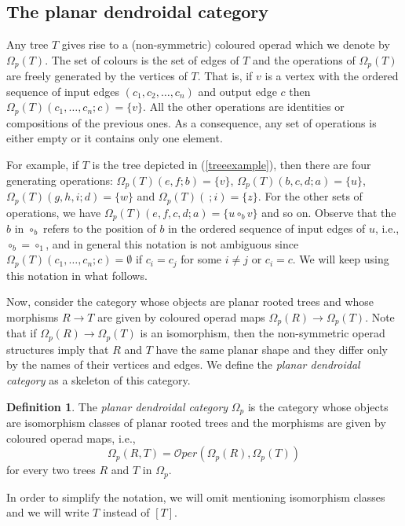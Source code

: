 \documentclass[a4paper]{amsart}
\theoremstyle{plain}
\theoremstyle{definition}
\newtheorem{dfn}[thm]{Definition}
\theoremstyle{remark}
\newcommand{\rpd}{\Omega_p}
\newcommand{\To}{\longrightarrow}
\newcommand{\Oper}{\mathcal{O}per}
\numberwithin{equation}{section}
\numberwithin{figure}{section}
\begin{document}
\subsection{The planar dendroidal category }\label{the basic category}
Any tree $T$ gives rise to a (non-symme\-tric) coloured operad which
we denote by $\Omega_p(T)$. The set of colours is the set of edges of
$T$ and the operations of $\Omega_p(T)$ are freely generated by the
vertices of $T$. That is, if $v$ is a vertex with the ordered
sequence of input edges $(c_1, c_2, \ldots, c_n)$ and output edge
$c$ then $\Omega_p(T)(c_1,\ldots,c_n;c)=\{v\}$. All the other
operations are identities or compositions of the previous ones. As a
consequence, any set of operations is either empty or it contains
only one element.

For example, if $T$ is the tree depicted in (\ref{treeexample}), then there are four generating operations:
$\Omega_p(T)(e,f;b)=\{v\}$, $\Omega_p(T)(b,c,d;a)=\{u\}$, $\Omega_p(T)(g,h,i;d)=\{w\}$ and $\Omega_p(T)(\ ;i)=\{z\}$.
For the other sets of operations, we have $\Omega_p(T)(e,f,c,d;a)=\{u\circ_b v\}$ and so on.
Observe that the $b$ in $\circ_b$ refers to the position of $b$ in the ordered sequence of input edges of $u$, i.e.,
$\circ_b=\circ_1$, and in general this notation is not ambiguous since $\Omega_p(T)(c_1,\ldots, c_n;c)=\emptyset$ if $c_i=c_j$
for some $i\neq j$ or $c_i=c$. We will keep using this notation in what follows.

Now, consider the category whose objects are planar rooted trees and whose morphisms $R\To T$ are given by coloured
operad maps $\Omega_p(R)\To\Omega_p(T)$. Note that if $\Omega_p(R)\longrightarrow \Omega_p(T)$ is an isomorphism, then the
non-symmetric operad structures imply that $R$ and $T$ have the same planar shape and they differ only by the names of
their vertices and edges. We define the \textit{planar dendroidal category} as a skeleton of this category.

\begin{dfn}
    The \emph{planar dendroidal category} $\rpd$ is the category whose objects are isomorphism classes of
    planar rooted trees and the morphisms are given by coloured operad maps, i.e.,
    $$
        \rpd(R,T)=\Oper(\Omega_p(R), \Omega_p(T))
    $$
    for every two trees $R$ and $T$ in $\rpd$.
\end{dfn}

In order to simplify the notation, we will omit mentioning
isomorphism classes and we will write $T$ instead of $[T]$.
\end{document}
